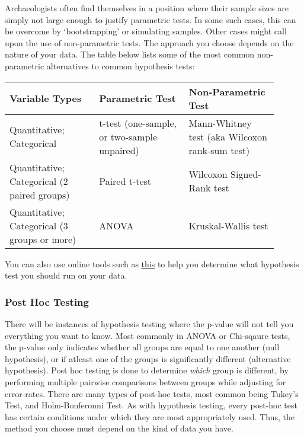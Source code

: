 \documentclass{article}
\begin{document}
Archaeologists often find themselves in a position where their sample sizes are simply not large enough to justify parametric tests. In some such cases, this can be overcome by ‘bootstrapping’ or simulating samples. Other cases might call upon the use of non-parametric tests. The approach you choose depends on the nature of your data. 
\newpage
The table below lists some of the most common non-parametric alternatives to common hypothesis tests:

\begin{center}
\begin{tabular}{ |>{\centering\arraybackslash}p{0.3\linewidth} |>{\centering\arraybackslash} p{0.3\linewidth}| >{\centering\arraybackslash}p{0.3\linewidth}|}
 \hline
 \textbf{Variable Types} & \textbf{Parametric Test} & \textbf{Non-Parametric Test }\\ 
    \hline
 Quantitative; Categorical & t-test (one-sample, or two-sample unpaired) & Mann-Whitney test (aka Wilcoxon rank-sum test)\\ 
 \hline
 Quantitative; Categorical (2 paired groups) & Paired t-test & Wilcoxon Signed-Rank test\\ 
 \hline
 Quantitative; Categorical (3 groups or more) & ANOVA & Kruskal-Wallis test\\
 \hline
\end{tabular}
\end{center}

You can also use online tools such as \href{https://www.socscistatistics.com/tests/what_stats_test_wizard.aspx}{this} to help you determine what hypothesis test you should run on your data.

\subsubsection{Post Hoc Testing}

There will be instances of hypothesis testing where the p-value will not tell you everything you want to know. Most commonly in ANOVA or Chi-sqaure tests, the p-value only indicates whether all groups are equal to one another (null hypothesis), or if atleast one of the groups is significantly different (alternative hypothesis). Post hoc testing is done to determine \textit{which} group is different, by performing multiple pairwise comparisons between groups while adjusting for error-rates. There are many types of post-hoc tests, most common being  Tukey's Test, and Holm-Bonferonni Test. As with hypothesis testing, every post-hoc test has certain conditions under which they are most appropriately used. Thus, the method you choose must depend on the kind of data you have.
\end{document}
